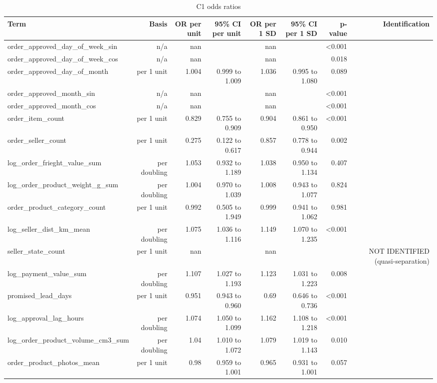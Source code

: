 \begin{table}[htbp]
\centering
\small
\caption{C1 odds ratios}
\begin{tabular}{lrrrrrrr}
\toprule
Term & Basis & OR per unit & 95\% CI per unit & OR per 1 SD & 95\% CI per 1 SD & p-value & Identification \\
\midrule
order\_approved\_day\_of\_week\_sin & n/a & nan &  & nan &  & <0.001 &  \\
order\_approved\_day\_of\_week\_cos & n/a & nan &  & nan &  & 0.018 &  \\
order\_approved\_day\_of\_month & per 1 unit & 1.004 & 0.999 to 1.009 & 1.036 & 0.995 to 1.080 & 0.089 &  \\
order\_approved\_month\_sin & n/a & nan &  & nan &  & <0.001 &  \\
order\_approved\_month\_cos & n/a & nan &  & nan &  & <0.001 &  \\
order\_item\_count & per 1 unit & 0.829 & 0.755 to 0.909 & 0.904 & 0.861 to 0.950 & <0.001 &  \\
order\_seller\_count & per 1 unit & 0.275 & 0.122 to 0.617 & 0.857 & 0.778 to 0.944 & 0.002 &  \\
log\_order\_frieght\_value\_sum & per doubling & 1.053 & 0.932 to 1.189 & 1.038 & 0.950 to 1.134 & 0.407 &  \\
log\_order\_product\_weight\_g\_sum & per doubling & 1.004 & 0.970 to 1.039 & 1.008 & 0.943 to 1.077 & 0.824 &  \\
order\_product\_category\_count & per 1 unit & 0.992 & 0.505 to 1.949 & 0.999 & 0.941 to 1.062 & 0.981 &  \\
log\_seller\_dist\_km\_mean & per doubling & 1.075 & 1.036 to 1.116 & 1.149 & 1.070 to 1.235 & <0.001 &  \\
seller\_state\_count & per 1 unit & nan &  & nan &  &  & NOT IDENTIFIED (quasi-separation) \\
log\_payment\_value\_sum & per doubling & 1.107 & 1.027 to 1.193 & 1.123 & 1.031 to 1.223 & 0.008 &  \\
promised\_lead\_days & per 1 unit & 0.951 & 0.943 to 0.960 & 0.69 & 0.646 to 0.736 & <0.001 &  \\
log\_approval\_lag\_hours & per doubling & 1.074 & 1.050 to 1.099 & 1.162 & 1.108 to 1.218 & <0.001 &  \\
log\_order\_product\_volume\_cm3\_sum & per doubling & 1.04 & 1.010 to 1.072 & 1.079 & 1.019 to 1.143 & 0.010 &  \\
order\_product\_photos\_mean & per 1 unit & 0.98 & 0.959 to 1.001 & 0.965 & 0.931 to 1.001 & 0.057 &  \\

\end{tabular}
\end{table}
